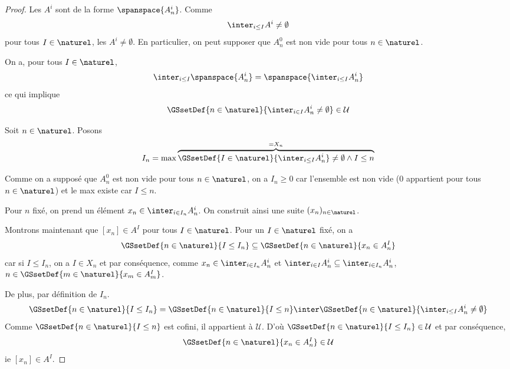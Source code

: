 \ifdefined\outputproof
\begin{proof}
	Les $A^{i}$ sont de la forme $\spanspace{A^{i}_{n}}$. Comme
	\begin{equation}
		\inter_{i \leq I} A^{i} \neq \emptyset
	\end{equation}
	pour tous $I \in \naturel$, les $A^{i} \neq
	\emptyset$. En particulier, on peut supposer que $A^{0}_{n}$ est non vide
	pour tous $n \in \naturel$.

	On a, pour tous $I \in \naturel$,
	\begin{equation}
		\inter_{i \leq I} \spanspace{A^{i}_{n}} = \spanspace{\inter_{i \leq I}
		A^{i}_{n}}
	\end{equation}
	ce qui implique
	\begin{equation}
		\GSsetDef{n \in \naturel}{\inter_{i \in I} A^{i}_{n} \neq \emptyset} \in
		\mathcal{U}
	\end{equation}

	Soit $n \in \naturel$. Posons
	\begin{equation}
		I_{n} = \max \overbrace{\GSsetDef{I \in \naturel}{\inter_{i \leq I}
		A^{i}_{n}} \neq \emptyset \wedge I \leq n}^{= X_{n}}
	\end{equation}

	Comme on a supposé que $A^{0}_{n}$ est non vide pour tous $n \in \naturel$,
	on a $I_{n} \geq 0$ car l'ensemble est non vide ($0$ appartient pour tous $n
	\in \naturel$) et le max existe car $I \leq n$.

	Pour $n$ fixé, on prend un élément $x_{n} \in \inter_{i \in I_{n}}
	A^{i}_{n}$. On construit ainsi une suite $(x_{n})_{n \in \naturel}$.

	Montrons maintenant que $[x_{n}] \in A^{I}$ pour tous $I \in \naturel$. Pour
	un $I \in \naturel$ fixé, on a
	\begin{equation}
		\GSsetDef{n \in \naturel}{I \leq I_{n}} \subseteq \GSsetDef{n \in
		\naturel}{x_{n} \in A^{I}_{n}}
	\end{equation}
	car si $I \leq I_{n}$, on a $I \in X_{n}$ et par conséquence, comme $x_{n}
	\in \inter_{i \in I_{n}} A^{i}_{n}$ et $\inter_{i \in I} A^{i}_{n} \subseteq \inter_{i
		\in I_{n}} A^{i}_{n}$, $n \in \GSsetDef{m \in \naturel}{x_{m} \in
		A^{I}_{m}}$.

	De plus, par définition de $I_{n}$.
	\begin{equation}
		\GSsetDef{n \in \naturel}{I \leq I_{n}} = \GSsetDef{n \in \naturel}{I
		\leq n} \inter \GSsetDef{n \in \naturel}{\inter_{i \leq I} A^{i}_{n}
	\neq \emptyset}
	\end{equation}
	Comme $\GSsetDef{n \in \naturel}{I \leq n}$ est cofini, il appartient à
	$\mathcal{U}$. D'où $\GSsetDef{n \in \naturel}{I \leq I_{n}} \in
	\mathcal{U}$ et par conséquence,
	\begin{equation}
		\GSsetDef{n \in \naturel}{x_{n} \in A^{I}_{n}} \in \mathcal{U}
	\end{equation}
	ie $[x_{n}] \in A^{I}$.
\end{proof}
\fi

